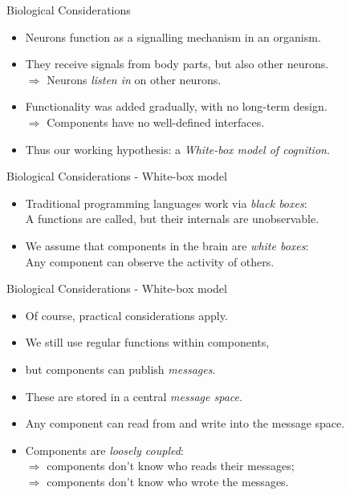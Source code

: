 \documentclass{beamer}
\begin{document}
   \begin{frame}{Biological Considerations}
      \begin{itemize}
         \item Neurons function as a signalling mechanism in an organism.
         \pause
         \item They receive signals from body parts, but also other neurons.\\
            $\Rightarrow$ Neurons \emph{listen in} on other neurons.
         \pause
         \item Functionality was added gradually, with no long-term design.\\
            $\Rightarrow$ Components have no well-defined interfaces.
         \pause
         \item Thus our working hypothesis: a \emph{White-box model of cognition}.
       \end{itemize}
   \end{frame}
   
   \begin{frame}{Biological Considerations - White-box model}
      \begin{itemize}
         \item Traditional programming languages work via \emph{black boxes}:\\
              \vspace{2mm}
               A functions are called, but their internals are unobservable.
               \vspace{2mm}
         \item We assume that components in the brain are \emph{white boxes}:\\
              \vspace{2mm}
               Any component can observe the activity of others.
      \end{itemize}
   \end{frame}
   
   \begin{frame}{Biological Considerations - White-box model}
      \begin{itemize}
         \item Of course, practical considerations apply.
         \vspace{2mm}
         \item We still use regular functions within components,
         \item but components can publish \emph{messages}.
         \item These are stored in a central \emph{message space}.
         \item Any component can read from and write into the message space.
         \vspace{2mm}
         \item Components are \emph{loosely coupled}:\\
            $\Rightarrow$ components don't know who reads their messages;\\
            $\Rightarrow$ components don't know who wrote the messages.
      \end{itemize}
   \end{frame}
   
\end{document}
